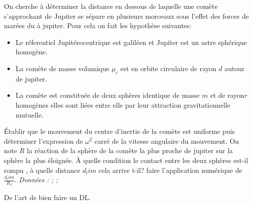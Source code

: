 \begin{Exercise}[title=(*) Limite de Roche]
On cherche à déterminer la distance en dessous de laquelle une comète s'approchant de Jupiter se sépare en plusieurs morceaux sous l'effet des forces de marées du à jupiter. Pour cela on fait les hypothèse suivantes:
\begin{itemize}
	\item Le réferentiel Jupitérocentrique est galiléen et Jupiter est un astre sphérique homogène.
	\item La comète de masse volumique $\mu_c$ est en orbite circulaire de rayon $d$ autour de jupiter.
	\item La comète est constituée de deux sphères identique de masse $m$ et de rayon$r$ homogènes elles sont liées entre elle par leur attraction gravitationnelle mutuelle.
\end{itemize}
\Question Établir que le mouvement du centre d'inertie de la comète est uniforme puis déterminer l'expression de $\omega^2$ carré de la vitesse angulaire du mouvement.
\Question On note $R$ la réaction de la sphère  de la comète la plus proche de jupiter sur la sphère la plus éloignée. À quelle condition le contact entre les deux sphères est-il rompu , à quelle distance $d_lim$ cela arrive t-il?
\Question faire l'application numérique de $\frac{d_lim}{R_J}$.
\emph{Données : ; ; }
\end{Exercise}
\begin{Answer}
De l'art de bien faire un DL.
\end{Answer}
